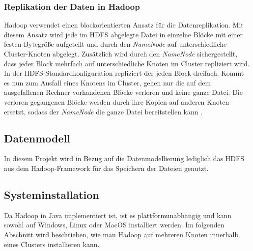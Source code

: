 \subsubsection{Replikation der Daten in Hadoop}
Hadoop verwendet einen blockorientierten Ansatz für die Datenreplikation. Mit diesem Ansatz wird jede im \ac{HDFS} abgelegte Datei in einzelne Blöcke mit einer festen Bytegröße aufgeteilt und durch den \textit{NameNode} auf unterschiedliche Cluster-Knoten abgelegt. Zusätzlich wird durch den \textit{NameNode} sichergestellt, dass jeder Block mehrfach auf unterschiedliche Knoten im Cluster repliziert wird.
In der HDFS-Standardkonfiguration repliziert der \cite{replikation} jeden Block dreifach. Kommt es nun zum Ausfall eines Knotens im Cluster, gehen nur die auf dem ausgefallenen Rechner vorhandenen Blöcke verloren und keine ganze Datei. Die verloren gegangenen Blöcke werden durch ihre Kopien auf anderen Knoten ersetzt, sodass der \textit{NameNode} die ganze Datei bereitstellen kann \cite{replikation}.



\subsection{Datenmodell}
In diesem Projekt wird in Bezug auf die Datenmodellierung lediglich das \ac{HDFS} aus dem Hadoop-Framework für das Speichern der Dateien genutzt. 


\subsection{Systeminstallation} %
Da Hadoop in Java implementiert ist, ist es plattformunabhängig und kann sowohl auf Windows, Linux oder MacOS installiert werden.
Im folgenden Abschnitt wird beschrieben, wie man Hadoop auf mehreren Knoten innerhalb eines Clusters installieren kann. 

